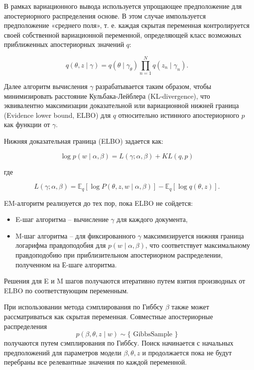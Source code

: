 \documentclass[12pt,a4paper, oneside]{extreport}
\begin{document}
В рамках вариационного вывода используется упрощающее предположение для апостериорного распределения  основе. В этом случае импользуется предположение «среднего поля», т. е. каждая скрытая переменная контролируется своей собственной вариационной переменной, определяющей класс возможных приближенных апостериорных значений $q$:

$$
q(\theta, z \mid \gamma)=q\left(\theta \mid \gamma_{\theta}\right) \prod_{n=1}^{N} q\left(z_{n} \mid \gamma_{n}\right).
$$

Далее алгоритм вычисления $\gamma$ разрабатывается  таким образом, чтобы минимизировать расстояние Кульбака-Лейблера (KL-divergence), что эквивалентно  максимизации  доказательной или вариационной  нижней граница (Evidence lower bound, ELBO) для $q$ относительно истинного апостериорного $p$ как функции от  $\gamma$.

Нижняя доказательная граница (ELBO) задается как:

$$\log p(w \mid \alpha, \beta)=L(\gamma ; \alpha, \beta)+K L(q, p)$$

где 

$$
L(\gamma ; \alpha, \beta)=\mathbb{E}_{q}[\log P(\theta, z, w \mid \alpha, \beta)]-\mathbb{E}_{q}[\log q(\theta, z)].
$$


EM-алгоритм  реализуется  до тех пор, пока ELBO не сойдется:

\begin{itemize}
	\item E-шаг алгоритма -- вычисление  $\gamma$  для каждого документа,
	\item  M-шаг алгоритма  -- для фиксированного $\gamma$   максимизируется  нижняя  граница  логарифма правдоподобия для $p(w \mid \alpha, \beta)$, что соответствует максимальному правдоподобию при приблизительном апостериорном распределении, полученном на Е-шаге алгоритма. 
\end{itemize} 

Решения для E и M  шагов получаются итеративно путем взятия производных от ELBO по соответствующим переменным.

При использовании метода сэмплирования по Гиббсу 
$\beta$  также может рассматриваться как скрытая переменная.
Совместные апостериорные распределения 
$$
p(\beta, \theta, z \mid w) \sim\{\text { GibbsSample }\}
$$ 
получаются путем сэмплирования по Гиббсу. 
Поиск начинается  с начальных предположений для параметров модели $\beta, \theta, z$  и продолжается пока не будут  перебраны  все релевантные значения по каждой переменной.
\end{document}
